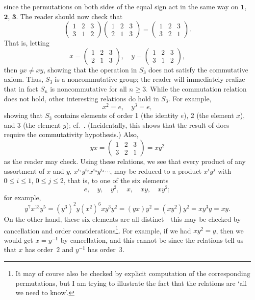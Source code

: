 since the permutations on both sides of the equal sign act in the same
way on $\mathbf{1}$, $\mathbf{2}$, $\mathbf{3}$. The reader should now
check that
\[
  \begin{pmatrix}1&2&3\\3&1&2\end{pmatrix}
  \begin{pmatrix}1&2&3\\2&1&3\end{pmatrix}
  = \begin{pmatrix}1&2&3\\3&2&1\end{pmatrix}.
\]
That is, letting
\[
  x = \begin{pmatrix}1&2&3\\2&1&3\end{pmatrix}, \quad y
  = \begin{pmatrix}1&2&3\\3&1&2\end{pmatrix},
\]
then $yx \neq xy$, showing that the operation in $S_3$ does not
satisfy the commutative axiom. Thus, $S_3$ is a noncommutative group;
the reader will immediately realize that in fact $S_n$ is
noncommutative for all $n \geq 3$.  While the commutation relation
does not hold, other interesting relations do hold in $S_3$. For
example,
\[
  x^2 = e, \quad y^3 = e,
\]
showing that $S_3$ contains elements of order 1 (the identity $e$), 2
(the element $x$), and 3 (the element $y$); cf.\
. (Incidentally, this shows that the
result of \Cref{exer:groups:maximal-order-divides} does require the
commutativity hypothesis.) Also,
\[
  yx = \begin{pmatrix}1&2&3\\3&2&1\end{pmatrix} = xy^2
\]
as the reader may check. Using these relations, we see that every
product of any assortment of $x$ and $y$,
$x^{i_1} y^{i_2} x^{i_3} y^{i_4} \cdots$, may be reduced to a product
$x^i y^j$ with $0 \leq i \leq 1$, $0 \leq j \leq 2$, that is, to one
of the six elements
\[
  e, \quad y, \quad y^2, \quad x, \quad xy, \quad xy^2;
\]
for example,
\[
  y^7 x^{13} y^5 = (y^3)^2 y (x^2)^6 x y^3 y^2 = (yx) y^2 = (xy^2) y^2
  = xy^3 y = xy.
\]
On the other hand, these six elements are all distinct---this may be
checked by cancellation and order considerations\footnote{It may of
  course also be checked by explicit computation of the corresponding
  permutations, but I am trying to illustrate the fact that the
  relations are `all we need to know'.}. For example, if we had
$xy^2 = y$, then we would get $x = y^{-1}$ by cancellation, and this
cannot be since the relations tell us that $x$ has order~$2$ and
$y^{-1}$ has order~$3$.

